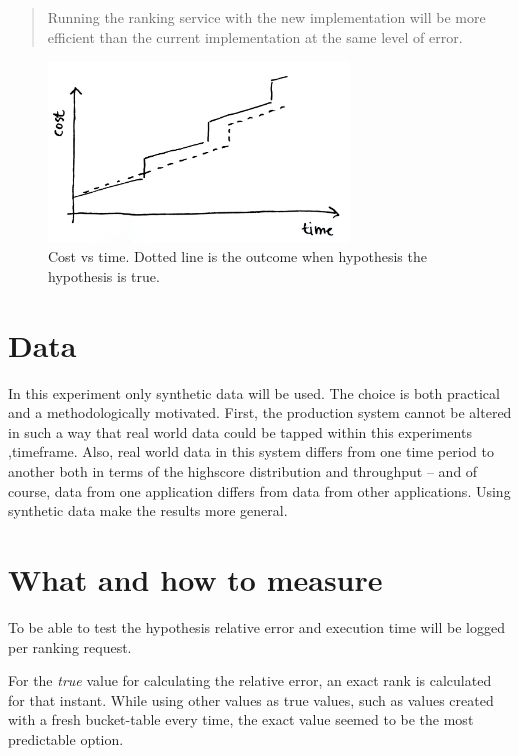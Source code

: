 \blockquote{Running the ranking service with the new implementation will be more efficient than the current implementation at the same level of error.}

\begin{figure}[h]
  \centering
  \caption{Cost vs time. Dotted line is the outcome when hypothesis the hypothesis is true.}
  \label{fig:cost}
  \includegraphics[width=8cm]{img/hypothesis.jpg}
\end{figure} 


\section{Data}

In this experiment only synthetic data will be used. The choice is both practical and a methodologically motivated. First, the production system cannot be altered in such a way that real world data could be tapped within this experiments ,timeframe. Also, real world data in this system differs from one time period to another both in terms of the highscore distribution and throughput -- and of course, data from one application differs from data from other applications. Using synthetic data make the results more general.



\section{What and how to measure}

To be able to test the hypothesis relative error and execution time will be logged per ranking request.

For the \emph{true} value for calculating the relative error, an exact rank is calculated for that instant. While using other values as true values, such as values created with a fresh bucket-table every time, the exact value seemed to be the most predictable option.

